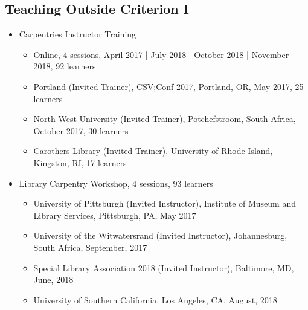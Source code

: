 \subsection{Teaching Outside Criterion I}


\begin{itemize}[label={},leftmargin=!,labelindent=5pt,itemindent=-15pt]
  \item Carpentries Instructor Training
  \begin{itemize}
    \item Online, 4 sessions, April 2017 | July 2018 | October 2018 | November 2018, 92 learners
    \item Portland (Invited Trainer), CSV;Conf 2017, Portland, OR, May 2017, 25 learners
    \item North-West University (Invited Trainer), Potchefstroom, South Africa, October 2017, 30 learners
    \item Carothers Library (Invited Trainer), University of Rhode Island, Kingston, RI, 17 learners
  \end{itemize}
  \item Library Carpentry Workshop, 4 sessions,	93 learners
  \begin{itemize}
    \item University of Pittsburgh (Invited Instructor), Institute of Museum and Library Services, Pittsburgh, PA, May 2017
    \item University of the Witwatersrand (Invited Instructor), Johannesburg, South Africa, September, 2017
    \item Special Library Association 2018 (Invited Instructor), Baltimore, MD, June, 2018
    \item University of Southern California, Los Angeles, CA, August, 2018
  \end{itemize}
\end{itemize}
